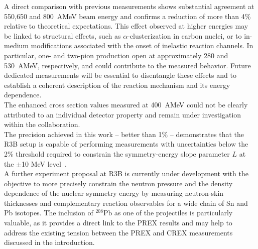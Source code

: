 A direct comparison with previous measurements shows substantial agreement at 550,650 and 800~AMeV beam energy and confirms a reduction of more than 4\% relative to theoretical expectations.
This effect observed at higher energies may be linked to structural effects, such as $\alpha$-clusterization in carbon nuclei, or to in-medium modifications associated with the onset of inelastic reaction channels. In particular, one- and two-pion production open at approximately 280 and 530~AMeV, respectively, and could contribute to the measured behavior. Future dedicated measurements will be essential to disentangle these effects and to establish a coherent description of the reaction mechanism and its energy dependence.\\
The enhanced cross section values measured at 400~AMeV could not be clearly attributed to an individual detector property and remain under investigation within the collaboration.\\
The precision achieved in this work -- better than 1\% -- demonstrates that the R3B setup is capable of performing measurements with uncertainties below the 2\% threshold required to constrain the symmetry-energy slope parameter $L$ at the $\pm$10 MeV level~\cite{aumann2017peeling}.\\
A further experiment proposal at R3B is currently under development with the objective to more precisely constrain the neutron pressure and the density dependence of the nuclear symmetry energy by measuring neutron-skin thicknesses and complementary reaction observables for a wide chain of Sn and Pb isotopes. The inclusion of \(^ {208}\mathrm{Pb}\) as one of the projectiles is particularly valuable, as it provides a direct link to the PREX results and may help to address the existing tension between the PREX and CREX measurements discussed in the introduction.\\
